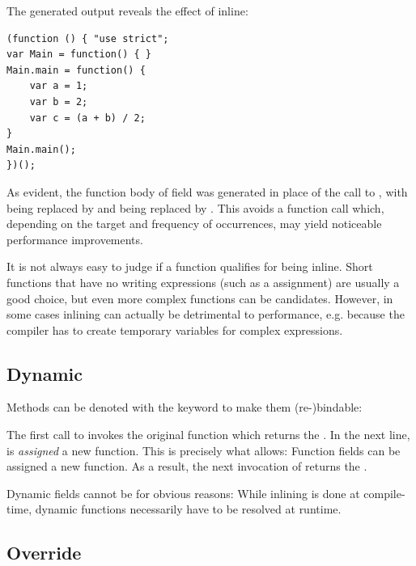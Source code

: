 \documentclass{haxe}
\begin{document}

The generated  output reveals the effect of inline:

\begin{lstlisting}
(function () { "use strict";
var Main = function() { }
Main.main = function() {
	var a = 1;
	var b = 2;
	var c = (a + b) / 2;
}
Main.main();
})();
\end{lstlisting}

As evident, the function body  of field  was generated in place of the call to , with  being replaced by  and  being replaced by . This avoids a function call which, depending on the target and frequency of occurrences, may yield noticeable performance improvements.

It is not always easy to judge if a function qualifies for being inline. Short functions that have no writing expressions (such as a \expr{=} assignment) are usually a good choice, but even more complex functions can be candidates. However, in some cases inlining can actually be detrimental to performance, e.g. because the compiler has to create temporary variables for complex expressions.

\subsection{Dynamic}
\label{class-field-dynamic}

Methods can be denoted with the  keyword to make them (re-)bindable:


The first call to  invokes the original function which returns the  . In the next line,  is \emph{assigned} a new function. This is precisely what  allows: Function fields can be assigned a new function. As a result, the next invocation of  returns the  .

Dynamic fields cannot be  for obvious reasons: While inlining is done at compile-time, dynamic functions necessarily have to be resolved at runtime.


\subsection{Override}
\label{class-field-override}
\end{document}

